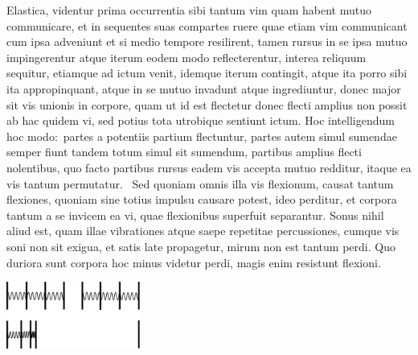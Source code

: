 Elastica, videntur prima occurrentia sibi tantum vim quam habent mutuo communicare, et
in sequentes 
%
suas compartes ruere quae etiam vim communicant cum ipsa adveniunt et
si medio tempore resilirent, tamen rursus in se ipsa mutuo impingerentur atque iterum
eodem modo reflecterentur, interea reliquum sequitur, etiamque ad ictum venit, idemque iterum
contingit, atque ita porro sibi ita appropinquant, atque in se mutuo invadunt atque ingrediuntur,
donec major sit vis unionis\protect{} in corpore, quam ut  
%
%
id est flectetur donec flecti amplius non possit ab hac quidem vi, sed potius tota utrobique
sentiunt ictum. Hoc intelligendum hoc modo\lbrack:\rbrack\ partes a potentiis\protect{} partium flectuntur, 
partes autem simul sumendae semper fiunt  
%
%
tandem totum simul
sit sumendum, partibus amplius flecti nolentibus, quo facto 
%
%
partibus rursus eadem vis accepta\protect{} mutuo redditur, itaque ea vis tantum permuta\textlangle tur.\textrangle\ 
Sed quoniam omnis illa vis flexionum\protect{}, causat tantum flexiones\protect{}, quoniam sine totius
impulsu causare potest, ideo perditur, et corpora tantum a se invicem ea vi, quae 
flexionibus\protect{} superfuit separantur. Sonus\protect{} nihil aliud est, quam illae vibrationes atque saepe
repetitae percussiones, cumque vis soni non sit exigua, et satis late propagetur, mirum
non est tantum perdi. Quo duriora sunt corpora hoc minus videtur perdi, magis enim
resistunt flexioni\protect{}. 
\pend
\vspace{2.0em}
\centerline{\includegraphics[width=0.33\textwidth]{gesamttex/edit_VIII,3/images/LH_37_05_150-151_d2_151r.pdf}} 
